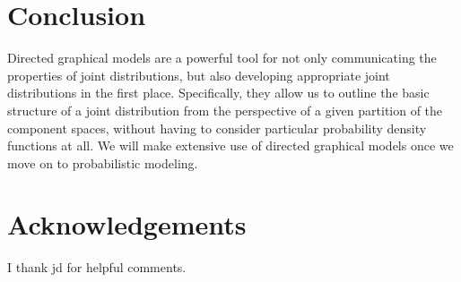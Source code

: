 \documentclass[
  letterpaper,
  DIV=11,
  numbers=noendperiod]{scrartcl}
\begin{document}
\section{Conclusion}\label{conclusion}

Directed graphical models are a powerful tool for not only communicating
the properties of joint distributions, but also developing appropriate
joint distributions in the first place. Specifically, they allow us to
outline the basic structure of a joint distribution from the perspective
of a given partition of the component spaces, without having to consider
particular probability density functions at all. We will make extensive
use of directed graphical models once we move on to probabilistic
modeling.

\section*{Acknowledgements}\label{acknowledgements}

I thank jd for helpful comments.
\end{document}
